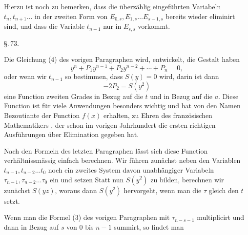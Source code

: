 Hierzu ist noch zu bemerken, dass die überzählig eingeführten
Variabeln $t_n, t_{n+1} \ldots$ in der zweiten Form von $E_{0,s}, E_{1,s} \ldots E_{s-1,s}$
bereits wieder eliminirt sind, und dass die Variable $t_{n-1}$ nur
in $E_{s,s}$ vorkommt.

\begin{center}
\S.\,73.

\end{center}

Die Gleichung (4) des vorigen Paragraphen wird, entwickelt,
die Gestalt haben
\[
y^n + P_1 y^{n-1} + P_2 y^{n-2} + \cdots + P_n = 0,
\]
oder wenn wir $t_{n-1}$ so bestimmen, dass $S(y) = 0$ wird,
darin ist dann
\[
- 2 P_2 = S(y^2)
\]
eine Function zweiten Grades in Bezug auf die $t$ und in Bezug
auf die $a$. Diese Function ist für viele Anwendungen besonders
wichtig und hat von  den Namen Bezoutiante
der Function $f(x)$ erhalten, zu Ehren des französischen Mathematikers
, der schon im vorigen Jahrhundert die ersten
richtigen Ausführungen über Elimination gegeben hat.

Nach den Formeln des letzten Paragraphen lässt sich diese
Function verhältnissmässig einfach berechnen. Wir führen zunächst
neben den Variablen $t_{n-1}, t_{n-2} \ldots t_0$ noch ein zweites
System davon unabhängiger Variabeln $\tau_{n-1}, \tau_{n-2} \ldots \tau_0$ ein und
setzen
Statt nun $S(y^2)$ zu bilden, berechnen wir zunächst $S(yz)$,
woraus dann $S(y^2)$ hervorgeht, wenn man die $\tau$ gleich den $t$
setzt.

Wenn man die Formel (3) des vorigen Paragraphen
mit $\tau_{n-s-1}$ multiplicirt und dann in Bezug auf $s$ von $0$ bis $n-1$
summirt, so findet man
